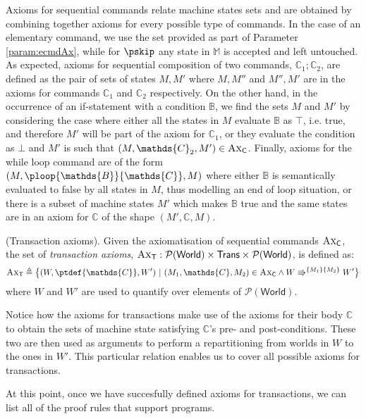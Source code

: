 Axioms for sequential commands relate machine states sets and are obtained by combining together axioms for every possible type of commands. In the case of an elementary command, we use the set provided as part of Parameter \ref{param:ecmdAx}, while for $\pskip$ any state in $\mathbb{M}$ is accepted and left untouched. As expected, axioms for sequential composition of two commands, $\mathds{C}_1 ; \mathds{C}_2$, are defined as the pair of sets of states $M, M'$ where $M, M''$ and $M'', M'$ are in the axioms for commands $\mathds{C}_1$ and $\mathds{C}_2$ respectively. On the other hand, in the occurrence of an if-statement with a condition $\mathds{B}$, we find the sets $M$ and $M'$ by considering the case where either all the states in $M$ evaluate $\mathds{B}$ as $\top$, i.e. true, and therefore $M'$ will be part of the axiom for $\mathds{C}_1$, or they evaluate the condition as $\bot$ and $M'$ is such that $(M, \mathds{C}_2, M') \in \textsc{Ax}_\mathsf{C}$. Finally, axioms for the while loop command are of the form $(M, \ploop{\mathds{B}}{\mathds{C}}, M)$ where either $\mathds{B}$ is semantically evaluated to false by all states in $M$, thus modelling an end of loop situation, or there is a subset of machine states $M'$ which makes $\mathds{B}$ true and the same states are in an axiom for $\mathds{C}$ of the shape $(M', \mathds{C}, M)$.

\begin{defn}
	\label{defn:transAx}
	(Transaction axioms).
	Given the axiomatisation of sequential commands $\textsc{Ax}_\mathsf{C}$, the set of \emph{transaction axioms}, $\textsc{Ax}_\mathsf{T} : \mathcal{P}(\mathsf{World}) \times \mathsf{Trans} \times \mathcal{P}(\mathsf{World})$, is defined as:
	\[
		\textsc{Ax}_\mathsf{T}
			\triangleq
		\big\{ (W, \ptdef{\mathds{C}}, W')\ |\ (M_1, \mathds{C}, M_2) \in \textsc{Ax}_\mathsf{C} \land W \Rrightarrow^{\{M_1\}\{M_2\}} W' \big\}
	\]
	where $W$ and $W'$ are used to quantify over elements of $\mathcal{P}(\mathsf{World})$.
\end{defn}
Notice how the axioms for transactions make use of the axioms for their body $\mathds{C}$ to obtain the sets of machine state satisfying $\mathds{C}$'s pre- and post-conditions. These two are then used as arguments to perform a repartitioning from worlds in $W$ to the ones in $W'$. This particular relation enables us to cover all possible axioms for transactions.

At this point, once we have succesfully defined axioms for transactions, we can list all of the proof rules that support programs.

